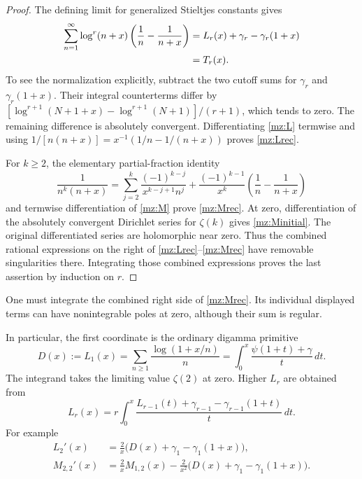 \documentclass[11pt,letterpaper]{article}
\numberwithin{equation}{section}
\theoremstyle{plain}
\theoremstyle{definition}
\theoremstyle{remark}
\begin{document}
\begin{proof}
The defining limit for generalized Stieltjes constants gives
\begin{align}
 \sum_{n=1}^{\infty}\log^r(n+x)
          \left(\frac1n-\frac1{n+x}\right)
 &=L_r(x)+\gamma_r-\gamma_r(1+x)\notag\\
 &=T_r(x).
 \label{mz:Tsum}
\end{align}
To see the normalization explicitly, subtract the two cutoff sums for
$\gamma_r$ and $\gamma_r(1+x)$. Their integral counterterms differ by
$[\log^{r+1}(N+1+x)-\log^{r+1}(N+1)]/(r+1)$, which tends to zero.
The remaining difference is absolutely convergent. Differentiating
\eqref{mz:L} termwise and using
$1/[n(n+x)]=x^{-1}(1/n-1/(n+x))$ proves \eqref{mz:Lrec}.

For $k\ge2$, the elementary partial-fraction identity
\begin{equation}
 \frac1{n^k(n+x)}
 =\sum_{j=2}^{k}\frac{(-1)^{k-j}}{x^{k-j+1}n^j}
   +\frac{(-1)^{k-1}}{x^k}
          \left(\frac1n-\frac1{n+x}\right)
 \label{mz:partial}
\end{equation}
and termwise differentiation of \eqref{mz:M} prove \eqref{mz:Mrec}.
At zero, differentiation of the absolutely convergent Dirichlet series
for $\zeta(k)$ gives \eqref{mz:Minitial}. The original differentiated
series are holomorphic near zero. Thus the combined rational expressions
on the right of \eqref{mz:Lrec}--\eqref{mz:Mrec} have removable
singularities there. Integrating those combined expressions proves the
last assertion by induction on $r$.
\end{proof}

One must integrate the combined right side of \eqref{mz:Mrec}. Its
individual displayed terms can have nonintegrable poles at zero, although
their sum is regular.

In particular, the first coordinate is the ordinary digamma primitive
\begin{equation}
 D(x):=L_1(x)
 =\sum_{n\ge1}\frac{\log(1+x/n)}n
 =\int_0^x\frac{\psi(1+t)+\gamma}{t}\,dt.
 \label{mz:D}
\end{equation}
The integrand takes the limiting value $\zeta(2)$ at zero. Higher $L_r$
are obtained from
\[
 L_r(x)=r\int_0^x
       \frac{L_{r-1}(t)+\gamma_{r-1}-\gamma_{r-1}(1+t)}t\,dt.
\]
For example
\begin{align}
 L_2'(x)&=\frac2x\bigl(D(x)+\gamma_1-\gamma_1(1+x)\bigr),\\
 M_{2,2}'(x)
 &=\frac2xM_{1,2}(x)
   -\frac2{x^2}\bigl(D(x)+\gamma_1-\gamma_1(1+x)\bigr).
\end{align}
\end{document}
